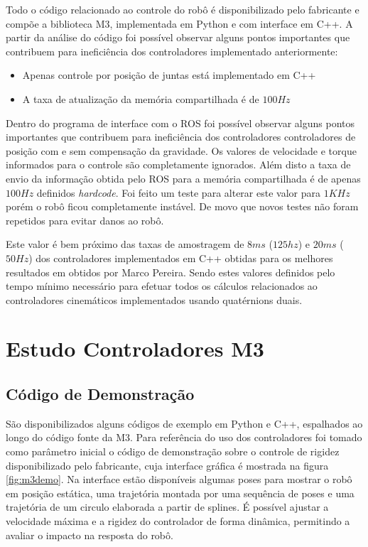 Todo o código relacionado ao controle do robô é disponibilizado pelo fabricante e compõe a biblioteca M3, implementada em Python e com interface em C++. A partir da análise do código foi possível observar alguns pontos importantes que contribuem para ineficiência dos controladores implementado anteriormente:

\begin{itemize}
    \item Apenas controle por posição de juntas está implementado em C++
    \item A taxa de atualização da memória compartilhada é de $100 Hz$
\end{itemize}

Dentro do programa de interface com o ROS foi possível observar alguns pontos importantes que contribuem para ineficiência dos controladores controladores de posição com e sem compensação da gravidade. Os valores de velocidade e torque informados para o controle são completamente ignorados. Além disto a taxa de envio da informação obtida pelo ROS para a memória compartilhada é de apenas $100Hz$ definidos \textit{hardcode}. Foi feito um teste para alterar este valor para $1KHz$ porém o robô ficou completamente instável. De movo que novos testes não foram repetidos para evitar danos ao robô.

Este valor é bem próximo das taxas de amostragem de $8 ms$ ($125 hz$) e $20 ms$ ($50 Hz$) dos controladores implementados em C++ obtidas para os melhores resultados em \cite{nobody} obtidos por Marco Pereira. Sendo estes valores definidos pelo tempo mínimo necessário para efetuar todos os cálculos relacionados ao controladores cinemáticos implementados usando quatérnions duais.

\section{Estudo Controladores M3}

\subsection{Código de Demonstração}

São disponibilizados alguns códigos de exemplo em Python e C++, espalhados ao longo do código fonte da M3. Para referência do uso dos controladores foi tomado como parâmetro inicial o código de demonstração sobre o controle de rigidez disponibilizado pelo fabricante, cuja interface gráfica é mostrada na figura \ref{fig:m3demo}. Na interface estão disponíveis algumas poses para mostrar o robô em posição estática, uma trajetória montada por uma sequência de poses e uma trajetória de um circulo elaborada a partir de splines. É possível ajustar a velocidade máxima e a rigidez do controlador de forma dinâmica, permitindo a avaliar o impacto na resposta do robô.

